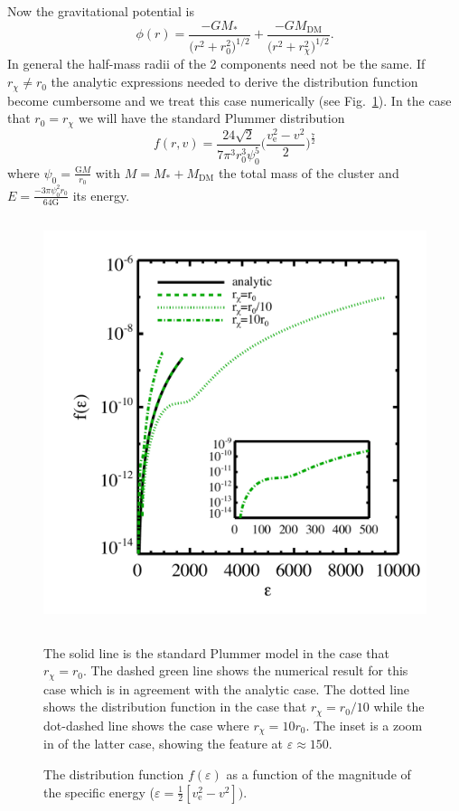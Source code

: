 \documentclass[aps,floatfix,prd,showpacs]{revtex4}
\newcommand{\vesc}{v_{\text{e}}}
\newcommand{\G}{\text{G}}
\newcommand{\rx}{r_\chi}
\newcommand{\MDM}{M_{\mathrm{DM}}}
\begin{document}
Now the gravitational potential is
%
\begin{equation} 
	\phi(r) = \frac{-GM_*}{\Big(r^2+r_0^2\Big)^{1/2}} + \frac{-G\MDM}{\Big(r^2+\rx^2\Big)^{1/2}}.
\end{equation}
%
%
In general the half-mass radii of the 2 components need not be the same.  If $\rx \neq r_0$ the analytic expressions needed to derive the distribution function become cumbersome and we treat this case numerically (see Fig.~\ref{dist func}).  In the case that $r_0 = \rx$ we will have the standard Plummer distribution
%
\begin{equation} 
	f(r,v) = \frac{24\sqrt{2}}{7\pi^3r_0^3\psi_0^5}\bigg(\frac{\vesc^2 - {v}^2}{2}\bigg)^\frac{7}{2}
\end{equation}
%
%
where $\psi_0 = \frac{\G M}{r_0}$ with $M = M_* + M_{\mathrm{DM}}$ the total mass of the cluster and $E = \frac{-3\pi\psi_0^2r_0}{64\G}$ its energy.  
%
\begin{figure}[htp]
\centering
\includegraphics[width=12cm, height=12cm]{Plummer_Compare}
\caption{The distribution function $f(\varepsilon)$ as a function of the magnitude of the specific energy \big($\varepsilon = \frac{1}{2}[\vesc^2-v^2]\big).$}  The solid line is the standard Plummer model in the case that $\rx = r_0$.  The dashed green line shows the numerical result for this case which is in agreement with the analytic case.  The dotted line shows the distribution function in the case that $\rx = r_0/10$ while the dot-dashed line shows the case where $\rx = 10r_0$.  The inset is a zoom in of the latter case, showing the feature at $\varepsilon \approx 150$.
\label{dist func}
\end{figure}
%
%
\end{document}
